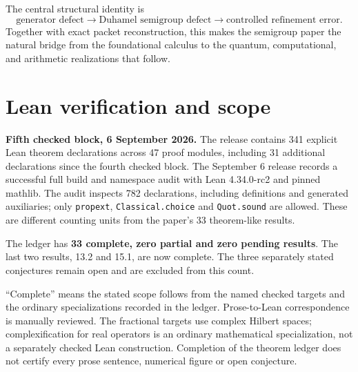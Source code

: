\documentclass[11pt,a4paper]{article}
\theoremstyle{definition}
\theoremstyle{remark}
\begin{document}
The central structural identity is
\[
\boxed{
\text{generator defect}
\longrightarrow
\text{Duhamel semigroup defect}
\longrightarrow
\text{controlled refinement error}.
}
\]
Together with exact packet reconstruction, this makes the semigroup paper the natural bridge from the foundational calculus to the quantum, computational, and arithmetic realizations that follow.

\clearpage
\appendix
\section{Lean verification and scope}\label{core:section:20}\label{core:sec:lean-status}
\noindent\textbf{Fifth checked block, 6 September 2026.}
The release contains 341 explicit Lean theorem declarations across 47 proof modules,
including 31 additional declarations since the fourth checked block. The September 6 release records a successful full
build and namespace audit with Lean 4.34.0-rc2 and pinned mathlib. The audit
inspects 782 declarations, including definitions and generated auxiliaries; only
\texttt{propext}, \texttt{Classical.choice} and \texttt{Quot.sound} are allowed.
These are different counting units from the paper's 33 theorem-like results.

The ledger has \textbf{33 complete, zero partial and zero pending results}.
The last two results, 13.2 and 15.1, are now complete. The three separately stated
conjectures remain open and are excluded from this count.

``Complete'' means the stated scope follows from the named checked targets
and the ordinary specializations recorded in the ledger. Prose-to-Lean correspondence
is manually reviewed. The fractional targets use complex Hilbert spaces;
complexification for real operators is an ordinary mathematical specialization,
not a separately checked Lean construction. Completion of the theorem ledger does
not certify every prose sentence, numerical figure or open conjecture.
\end{document}
